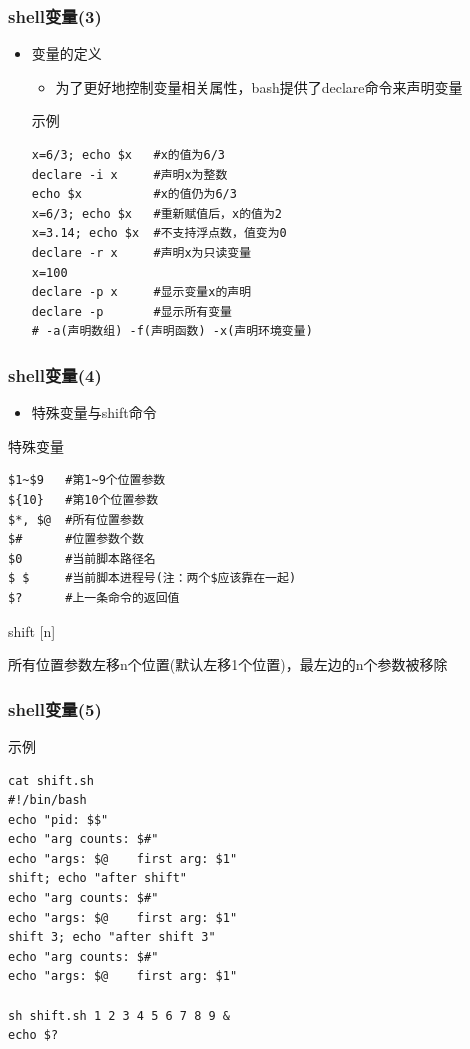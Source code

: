 \documentclass[xcolor=svgnames,presentation]{beamer}
\begin{document}
\begin{frame}[fragile]
\frametitle{shell变量(3)}
\label{sec-1-2-4}
\begin{itemize}

\item 变量的定义
\label{sec-1-2-4-1}%
\begin{itemize}

\item 为了更好地控制变量相关属性，bash提供了declare命令来声明变量
\label{sec-1-2-4-1-1}%
\end{itemize} %
\begin{exampleblock}{示例}
\label{sec-1-2-4-1-2}


\begin{verbatim}
x=6/3; echo $x   #x的值为6/3
declare -i x     #声明x为整数
echo $x          #x的值仍为6/3
x=6/3; echo $x   #重新赋值后，x的值为2
x=3.14; echo $x  #不支持浮点数，值变为0
declare -r x     #声明x为只读变量
x=100
declare -p x     #显示变量x的声明
declare -p       #显示所有变量
# -a(声明数组) -f(声明函数) -x(声明环境变量)
\end{verbatim}
\end{exampleblock}
\end{itemize} %
\end{frame}
\begin{frame}[fragile]
\frametitle{shell变量(4)}
\label{sec-1-2-5}
\begin{itemize}

\item 特殊变量与shift命令
\label{sec-1-2-5-1}%
\end{itemize} %
\begin{exampleblock}{特殊变量}
\label{sec-1-2-5-2}


\begin{verbatim}
$1~$9   #第1~9个位置参数
${10}   #第10个位置参数
$*, $@  #所有位置参数
$#      #位置参数个数
$0      #当前脚本路径名
$ $     #当前脚本进程号(注：两个$应该靠在一起)
$?      #上一条命令的返回值
\end{verbatim}
\end{exampleblock}
\begin{block}{shift [n]}
\label{sec-1-2-5-3}

所有位置参数左移n个位置(默认左移1个位置)，最左边的n个参数被移除
\end{block}
\end{frame}
\begin{frame}[fragile]
\frametitle{shell变量(5)}
\label{sec-1-2-6}
\begin{exampleblock}{示例}
\label{sec-1-2-6-1}


\begin{verbatim}
cat shift.sh
#!/bin/bash
echo "pid: $$"
echo "arg counts: $#"
echo "args: $@    first arg: $1"
shift; echo "after shift"
echo "arg counts: $#"
echo "args: $@    first arg: $1"
shift 3; echo "after shift 3"
echo "arg counts: $#"
echo "args: $@    first arg: $1"

sh shift.sh 1 2 3 4 5 6 7 8 9 &
echo $?
\end{verbatim}
\end{exampleblock}
\end{frame}
\end{document}
